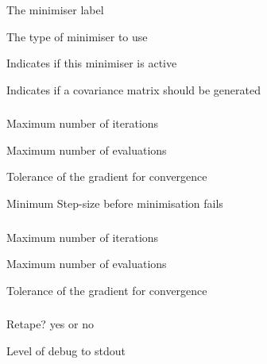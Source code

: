 
 {The minimiser label}

 {The type of minimiser to use}

 {Indicates if this minimiser is active}

 {Indicates if a covariance matrix should be generated}

\subsubsection[A D O L C]{}

 {Maximum number of iterations}

 {Maximum number of evaluations}

 {Tolerance of the gradient for convergence}

 {Minimum Step-size before minimisation fails}

\subsubsection[Beta Diff]{}

 {Maximum number of iterations}

 {Maximum number of evaluations}

 {Tolerance of the gradient for convergence}

\subsubsection[C P P A D]{}

 {Retape? yes or no}

 {Level of debug to stdout}

